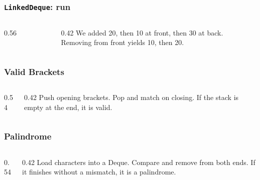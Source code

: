 \documentclass[aspectratio=169,10pt,compress]{beamer}
\begin{document}
\begin{frame}[t,fragile]\frametitle{\texttt{LinkedDeque}: run}
  \begin{columns}[T]
    \begin{column}{0.56\textwidth}
    \end{column}
    \begin{column}{0.42\textwidth}
      \small
      We added 20, then 10 at front, then 30 at back.\\
      Removing from front yields 10, then 20.
    \end{column}
  \end{columns}
\end{frame}


\begin{frame}[t,fragile]\frametitle{Valid Brackets}
  \begin{columns}[T]
    \begin{column}{0.54\textwidth}
    \end{column}
    \begin{column}{0.42\textwidth}
      \small
      Push opening brackets. Pop and match on closing.
      If the stack is empty at the end, it is valid.
    \end{column}
  \end{columns}
\end{frame}

\begin{frame}[t,fragile]\frametitle{Palindrome}
  \begin{columns}[T]
    \begin{column}{0.54\textwidth}
    \end{column}
    \begin{column}{0.42\textwidth}
      \small
      Load characters into a Deque. Compare and remove from both ends.
      If it finishes without a mismatch, it is a palindrome.
    \end{column}
  \end{columns}
\end{frame}
\end{document}

